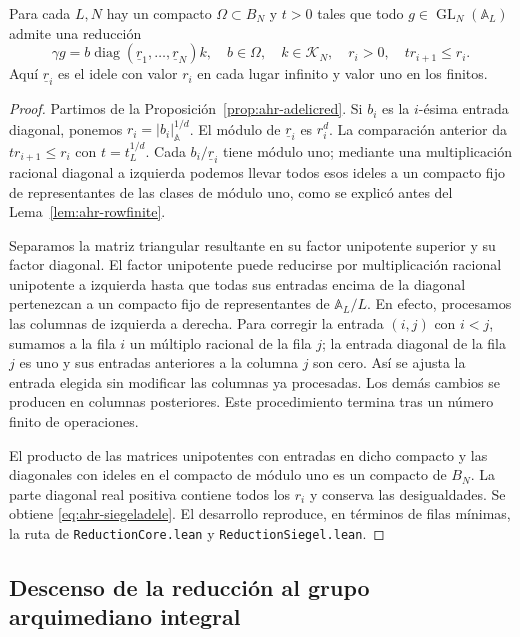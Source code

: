 \begin{proposicion}
\label{prop:ahr-siegeladele}
Para cada $L,N$ hay un compacto $\Omega\subset B_N$ y $t>0$ tales que todo $g\in\operatorname{GL}_N(\mathbb A_L)$ admite una reducción
\begin{equation}
 \gamma g=b\operatorname{diag}(\underline r_1,\ldots,\underline r_N)k,
 \quad b\in\Omega,\quad k\in\mathcal K_N,
 \quad r_i>0,\quad t r_{i+1}\le r_i.
 \label{eq:ahr-siegeladele}
\end{equation}
Aquí $\underline r_i$ es el idele con valor $r_i$ en cada lugar infinito y valor uno en los finitos.
\end{proposicion}
\begin{proof}
Partimos de la Proposición~\ref{prop:ahr-adelicred}. Si $b_i$ es la $i$-ésima entrada diagonal, ponemos $r_i=|b_i|_{\mathbb A}^{1/d}$. El módulo de $\underline r_i$ es $r_i^d$. La comparación anterior da $t r_{i+1}\le r_i$ con $t=t_L^{1/d}$. Cada $b_i/\underline r_i$ tiene módulo uno; mediante una multiplicación racional diagonal a izquierda podemos llevar todos esos ideles a un compacto fijo de representantes de las clases de módulo uno, como se explicó antes del Lema~\ref{lem:ahr-rowfinite}.

Separamos la matriz triangular resultante en su factor unipotente superior y su factor diagonal. El factor unipotente puede reducirse por multiplicación racional unipotente a izquierda hasta que todas sus entradas encima de la diagonal pertenezcan a un compacto fijo de representantes de $\mathbb A_L/L$. En efecto, procesamos las columnas de izquierda a derecha. Para corregir la entrada $(i,j)$ con $i<j$, sumamos a la fila $i$ un múltiplo racional de la fila $j$; la entrada diagonal de la fila $j$ es uno y sus entradas anteriores a la columna $j$ son cero. Así se ajusta la entrada elegida sin modificar las columnas ya procesadas. Los demás cambios se producen en columnas posteriores. Este procedimiento termina tras un número finito de operaciones.

El producto de las matrices unipotentes con entradas en dicho compacto y las diagonales con ideles en el compacto de módulo uno es un compacto de $B_N$. La parte diagonal real positiva contiene todos los $r_i$ y conserva las desigualdades. Se obtiene \eqref{eq:ahr-siegeladele}. El desarrollo reproduce, en términos de filas mínimas, la ruta de \texttt{ReductionCore.lean} y \texttt{ReductionSiegel.lean}.
\end{proof}

\subsection{Descenso de la reducción al grupo arquimediano integral}

